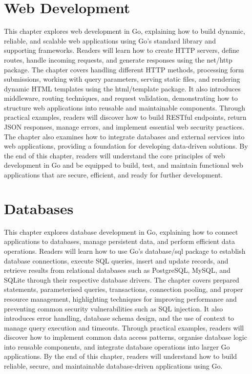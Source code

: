 \documentclass[12pt,oneside]{book}
\begin{document}
\chapter{Web Development}
\begin{chaptersummary}
This chapter explores web development in Go, explaining how to build dynamic, reliable, and scalable web applications using Go’s standard library and supporting frameworks. Readers will learn how to create HTTP servers, define routes, handle incoming requests, and generate responses using the net/http package. The chapter covers handling different HTTP methods, processing form submissions, working with query parameters, serving static files, and rendering dynamic HTML templates using the html/template package. It also introduces middleware, routing techniques, and request validation, demonstrating how to structure web applications into reusable and maintainable components. Through practical examples, readers will discover how to build RESTful endpoints, return JSON responses, manage errors, and implement essential web security practices. The chapter also examines how to integrate databases and external services into web applications, providing a foundation for developing data-driven solutions. By the end of this chapter, readers will understand the core principles of web development in Go and be equipped to build, test, and maintain functional web applications that are secure, efficient, and ready for further development.
\end{chaptersummary}


\chapter{Databases}
\begin{chaptersummary}
This chapter explores database development in Go, explaining how to connect applications to databases, manage persistent data, and perform efficient data operations. Readers will learn how to use Go’s database/sql package to establish database connections, execute SQL queries, insert and update records, and retrieve results from relational databases such as PostgreSQL, MySQL, and SQLite through their respective database drivers. The chapter covers prepared statements, parameterised queries, transactions, connection pooling, and proper resource management, highlighting techniques for improving performance and preventing common security vulnerabilities such as SQL injection. It also introduces error handling, database schema design, and the use of context to manage query execution and timeouts. Through practical examples, readers will discover how to implement common data access patterns, organise database logic into reusable components, and integrate database operations into larger Go applications. By the end of this chapter, readers will understand how to build reliable, secure, and maintainable database-driven applications using Go.
\end{chaptersummary}

\end{document}

